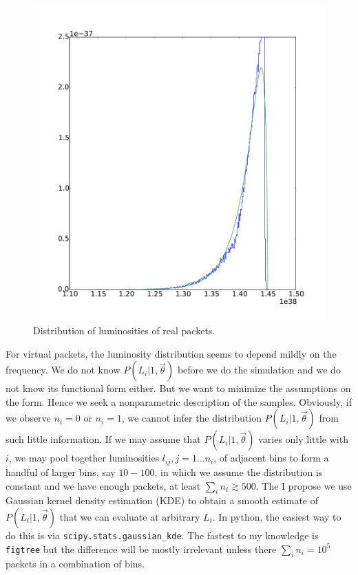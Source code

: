\documentclass[a4,12pt]{article}
\newcommand{\Lumi}{\ensuremath{L_i}}
\newcommand{\vecth}{\ensuremath{{\vec{\theta}}}}
\begin{document}
\begin{figure}[h]
  \begin{center}
    \includegraphics[width=\textwidth]{fit}
  \end{center}
  \caption{Distribution of luminosities of real packets.}
  \label{fig:hist}
\end{figure}

For virtual packets, the luminosity distribution seems to depend
mildly on the frequency.  We do not know $P(\Lumi | 1, \vecth)$ before
we do the simulation and we do not know its functional form
either. But we want to minimize the assumptions on the form. Hence we
seek a nonparametric description of the samples. Obviously, if we
observe $n_i=0$ or $n_i=1$, we cannot infer the distribution $P(\Lumi
| 1, \vecth)$ from such little information. If we may assume that
$P(\Lumi | 1, \vecth)$ varies only little with $i$, we may pool
together luminosities $l_{ij}, j=1 \dots n_i$, of adjacent bins to
form a handful of larger bins, say $10-100$, in which we assume the
distribution is constant and we have enough packets, at least $\sum_i
n_i \gtrsim 500$. The I propose we use Gaussian kernel density
estimation (KDE) to obtain a smooth estimate of $P(\Lumi | 1, \vecth)$
that we can evaluate at arbitrary $\Lumi$. In python, the easiest way
to do this is via \texttt{scipy.stats.gaussian\_kde}. The fastest to
my knowledge is \texttt{figtree} but the difference will be mostly
irrelevant unless there $\sum_i n_i = 10^5$ packets in a combination
of bins.
\end{document}
